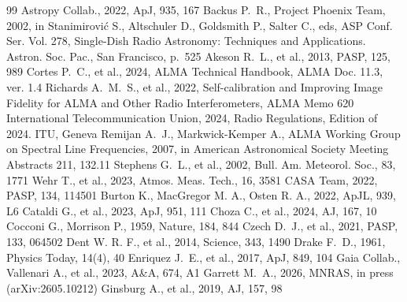 \documentclass[twocolumn,twocolappendix]{openjournal}
\begin{document}
%
%
%
%
%
\begin{thebibliography}{99}
 Astropy Collab., 2022, ApJ, 935, 167
 Backus P.~R., Project Phoenix Team, 2002, in Stanimirovi\'{c} S., Altschuler D., Goldsmith P., Salter C., eds, ASP Conf. Ser. Vol. 278, Single-Dish Radio Astronomy: Techniques and Applications. Astron. Soc. Pac., San Francisco, p.~525
 Akeson R.~L., et al., 2013, PASP, 125, 989
 Cortes P.~C., et al., 2024, ALMA Technical Handbook, ALMA Doc. 11.3, ver. 1.4
 Richards A.~M.~S., et al., 2022, Self-calibration and Improving Image Fidelity for ALMA and Other Radio Interferometers, ALMA Memo 620
 International Telecommunication Union, 2024, Radio Regulations, Edition of 2024. ITU, Geneva
 Remijan A.~J., Markwick-Kemper A., ALMA Working Group on Spectral Line Frequencies, 2007, in American Astronomical Society Meeting Abstracts 211, 132.11
 Stephens G.~L., et al., 2002, Bull. Am. Meteorol. Soc., 83, 1771
 Wehr T., et al., 2023, Atmos. Meas. Tech., 16, 3581
 CASA Team, 2022, PASP, 134, 114501
 Burton K., MacGregor M. A., Osten R. A., 2022, ApJL, 939, L6
 Cataldi G., et al., 2023, ApJ, 951, 111
 Choza C., et al., 2024, AJ, 167, 10
 Cocconi G., Morrison P., 1959, Nature, 184, 844
 Czech D.~J., et al., 2021, PASP, 133, 064502
 Dent W. R. F., et al., 2014, Science, 343, 1490
 Drake F.~D., 1961, Physics Today, 14(4), 40
 Enriquez J.~E., et al., 2017, ApJ, 849, 104
 Gaia Collab., Vallenari A., et al., 2023, A\&A, 674, A1
 Garrett M.~A., 2026, MNRAS, in press (arXiv:2605.10212)
 Ginsburg A., et al., 2019, AJ, 157, 98

\end{thebibliography}
\end{document}
